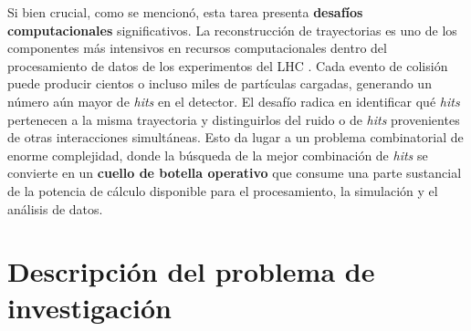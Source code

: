 Si bien crucial, como se mencionó, esta tarea presenta \textbf{desafíos computacionales} significativos. La reconstrucción de trayectorias es uno de los componentes más intensivos en recursos computacionales dentro del procesamiento de datos de los experimentos del LHC \cite{Tracking_challenges}. Cada evento de colisión puede producir cientos o incluso miles de partículas cargadas, generando un número aún mayor de \textit{hits} en el detector. El desafío radica en identificar qué \textit{hits} pertenecen a la misma trayectoria y distinguirlos del ruido o de \textit{hits} provenientes de otras interacciones simultáneas. Esto da lugar a un problema combinatorial de enorme complejidad, donde la búsqueda de la mejor combinación de \textit{hits} se convierte en un \textbf{cuello de botella operativo} que consume una parte sustancial de la potencia de cálculo disponible para el procesamiento, la simulación y el análisis de datos.

\section{Descripción del problema de investigación}
